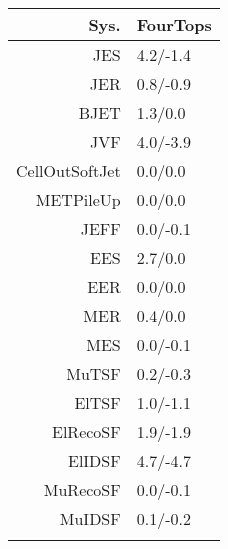 \begin{tabular}{r|p{.08\linewidth}}
\toprule
 Sys.  & FourTops \\
\toprule
JES  & 4.2/-1.4 \\
JER  & 0.8/-0.9 \\
BJET  & 1.3/0.0 \\
JVF  & 4.0/-3.9 \\
CellOutSoftJet  & 0.0/0.0 \\
METPileUp  & 0.0/0.0 \\
JEFF  & 0.0/-0.1 \\
EES  & 2.7/0.0 \\
EER  & 0.0/0.0 \\
MER  & 0.4/0.0 \\
MES  & 0.0/-0.1 \\
MuTSF  & 0.2/-0.3 \\
ElTSF  & 1.0/-1.1 \\
ElRecoSF  & 1.9/-1.9 \\
ElIDSF  & 4.7/-4.7 \\
MuRecoSF  & 0.0/-0.1 \\
MuIDSF  & 0.1/-0.2 \\
 \\
\bottomrule
\end{tabular}
